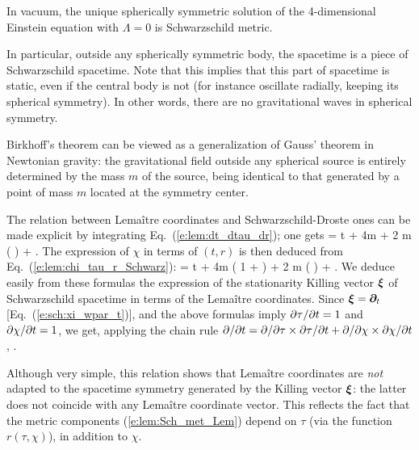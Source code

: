 \begin{greybox}
In vacuum, the unique spherically symmetric solution of the 4-dimensional
Einstein equation with $\Lambda=0$ is Schwarzschild metric.
\end{greybox}
In particular, outside any spherically symmetric body, the spacetime
is a piece of Schwarz\-schild spacetime. Note that this implies that this part of
spacetime is static, even if the central body is not (for instance oscillate
radially, keeping its spherical symmetry). In other words, there are no
gravitational waves in spherical symmetry.
\begin{remark}
Birkhoff's theorem can be viewed as a generalization of Gauss' theorem in Newtonian gravity:
the gravitational field outside any spherical source is entirely determined by the mass $m$ of
the source, being identical to that generated by a point of mass $m$ located at the symmetry
center.
\end{remark}

The relation between Lemaître coordinates and
Schwarzschild-Droste ones can be made explicit by integrating
Eq.~(\ref{e:lem:dt_dtau_dr}); one gets
\be
    \tau = t + 4m  + 2 m \ln \left(
         \right) + .
\ee
The expression of $\chi$ in terms of $(t,r)$ is then deduced from
Eq.~(\ref{e:lem:chi_tau_r_Schwarz}):
\be
    \chi = t + 4m  \left( 1 +  \right)
        + 2 m \ln \left(
         \right)  + .
\ee
We deduce easily from these formulas the expression of the stationarity
Killing vector $\bm{\xi}$ of Schwarzschild spacetime in terms of the
Lemaître coordinates. Since $\bm{\xi} = \bm{\partial}_t$ [Eq.~(\ref{e:sch:xi_wpar_t})],
and the above formulas
imply ${\partial \tau}/{\partial t} =1$ and ${\partial \chi}/{\partial t}=1$, we get, applying
the chain rule ${\partial }/{\partial t} = {\partial }/{\partial \tau} \times {\partial \tau}/{\partial t} + {\partial }/{\partial \chi} \times {\partial \chi}/{\partial t}$,
\be \label{e:lem:Killing_vect_Schwarz}
    \encadre{\w{\xi} = \wpar_\tau + \wpar_\chi }.
\ee
\begin{remark}
Although very simple, this relation shows that Lemaître coordinates are \emph{not}
adapted to the spacetime symmetry generated by the Killing vector $\bm{\xi}$:
the latter does not coincide with any Lemaître coordinate vector. This reflects
the fact that the metric components (\ref{e:lem:Sch_met_Lem}) depend on $\tau$
(via the function $r(\tau,\chi)$), in addition to $\chi$.
\end{remark}

